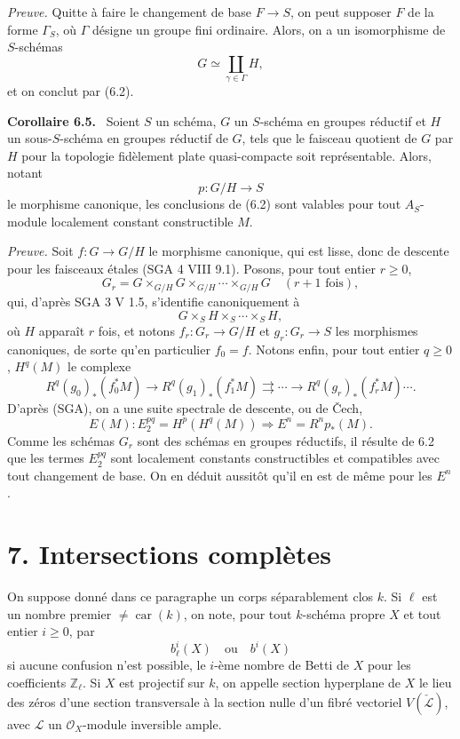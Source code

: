 \documentclass[11pt]{article}
\newenvironment{statement}[1]{\par\medskip\noindent\textbf{#1.}\ }{\par\medskip}
\begin{document}
\emph{Preuve.} Quitte à faire le changement de base $F\to S$, on peut supposer $F$ de la forme $\Gamma_S$, où $\Gamma$ désigne un groupe fini ordinaire. Alors, on a un isomorphisme de $S$-schémas
\[
G\simeq\coprod_{\gamma\in\Gamma}H,
\]
et on conclut par (6.2).

\begin{statement}{Corollaire 6.5}
Soient $S$ un schéma, $G$ un $S$-schéma en groupes réductif et $H$ un sous-$S$-schéma en groupes réductif de $G$, tels que le faisceau quotient de $G$ par $H$ pour la topologie fidèlement plate quasi-compacte soit représentable. Alors, notant
\[
p:G/H\to S
\]
le morphisme canonique, les conclusions de (6.2) sont valables pour tout $A_S$-module localement constant constructible $M$.
\end{statement}

\emph{Preuve.} Soit $f:G\to G/H$ le morphisme canonique, qui est lisse, donc de descente pour les faisceaux étales (SGA 4 VIII 9.1). Posons, pour tout entier $r\ge0$,
\[
G_r=G\times_{G/H}G\times_{G/H}\cdots\times_{G/H}G
\quad(r+1\text{ fois}),
\]
qui, d'après SGA 3 V 1.5, s'identifie canoniquement à
\[
G\times_S H\times_S\cdots\times_S H,
\]
où $H$ apparaît $r$ fois, et notons $f_r:G_r\to G/H$ et $g_r:G_r\to S$ les morphismes canoniques, de sorte qu'en particulier $f_0=f$. Notons enfin, pour tout entier $q\ge0$, $H^q(M)$ le complexe
\[
R^q(g_0)_*(f_0^*M)\to R^q(g_1)_*(f_1^*M)\rightrightarrows\cdots\to R^q(g_r)_*(f_r^*M)\cdots .
\]
D'après (SGA), on a une suite spectrale de descente, ou de Čech,
\[
E(M):E_2^{pq}=H^p(H^q(M))\Rightarrow E^n=R^np_*(M).
\]
Comme les schémas $G_r$ sont des schémas en groupes réductifs, il résulte de 6.2 que les termes $E_2^{pq}$ sont localement constants constructibles et compatibles avec tout changement de base. On en déduit aussitôt qu'il en est de même pour les $E^n$.

\section*{7. Intersections complètes}

On suppose donné dans ce paragraphe un corps séparablement clos $k$. Si $\ell$ est un nombre premier $\ne\operatorname{car}(k)$, on note, pour tout $k$-schéma propre $X$ et tout entier $i\ge0$, par
\[
b_\ell^i(X)\quad\text{ou}\quad b^i(X)
\]
si aucune confusion n'est possible, le $i$-ème nombre de Betti de $X$ pour les coefficients $\mathbb Z_\ell$. Si $X$ est projectif sur $k$, on appelle section hyperplane de $X$ le lieu des zéros d'une section transversale à la section nulle d'un fibré vectoriel $V(\check{\mathcal L})$, avec $\mathcal L$ un $\mathcal O_X$-module inversible ample.
\end{document}

